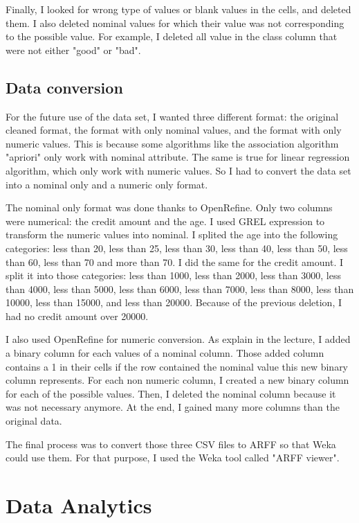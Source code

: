 \documentclass[12pt, a4paper]{article}
\begin{document}
Finally, I looked for wrong type of values or blank values in the cells, and deleted them. I also deleted nominal values for which their value was not corresponding to the possible value. For example, I deleted all value in the class column that were not either "good" or "bad".
\subsection{Data conversion}

For the future use of the data set, I wanted three different format: the original cleaned format, the format with only nominal values, and the format with only numeric values. This is because some algorithms like the association algorithm "apriori" only work with nominal attribute. The same is true for linear regression algorithm, which only work with numeric values. So I had to convert the data set into a nominal only and a numeric only format.

The nominal only format was done thanks to OpenRefine. Only two columns were numerical: the credit amount and the age. I used GREL expression to transform the numeric values into nominal. 
 I splited the age into the following categories: less than 20, less than 25, less than 30, less than 40, less than 50, less than 60, less than 70 and more than 70. I did the same for the credit amount. I split it into those categories: less than 1000, less than 2000, less than 3000, less than 4000, less than 5000, less than 6000, less than 7000, less than 8000, less than 10000, less than 15000, and less than 20000. Because of the previous deletion, I had no credit amount over 20000.

I also used OpenRefine for numeric conversion. As explain in the lecture, I added a binary column for each values of a nominal column. Those added column contains a 1 in their cells if the row contained the nominal value this new binary column represents. For each non numeric column, I created a new binary column for each of the possible values. Then, I deleted the nominal column because it was not necessary anymore. At the end, I gained many more columns than the original data.

The final process was to convert those three CSV files to ARFF so that Weka could use them. For that purpose, I used the Weka tool called "ARFF viewer".

\section{Data Analytics}
\end{document}
